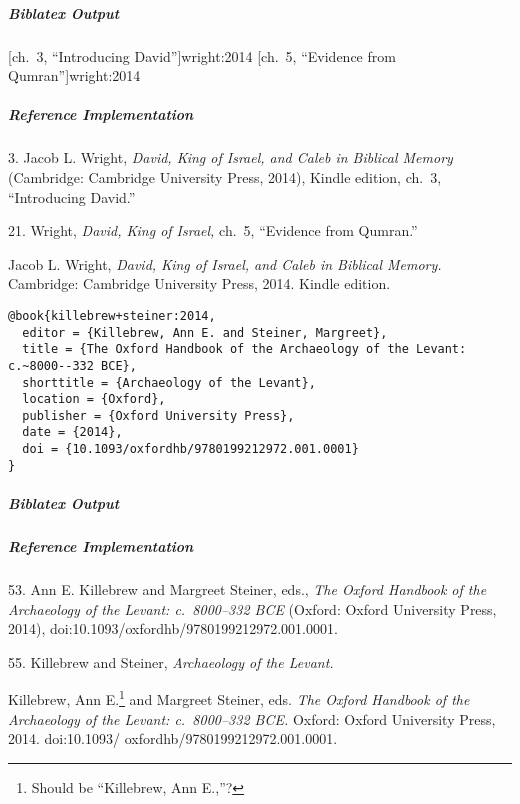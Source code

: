 \documentclass[a4paper]{article}
\newenvironment{biboutput}{%
  \subparagraph{Biblatex Output}
}{\color{black}}
\newenvironment{refimp}{%
  \subparagraph{Reference Implementation}
  \color{reference-colour}
  \rm
}{\par\color{black}}
\begin{document}
\begin{biboutput}
  [ch.~3, \mkbibquote{Introducing David}]{wright:2014}
  [ch.~5, \mkbibquote{Evidence from Qumran}]{wright:2014}
\end{biboutput}

\begin{refimp}
  \hspace*{\bibindent}3. Jacob L. Wright, \emph{David, King of Israel, and
  Caleb in Biblical Memory} (Cambridge: Cambridge University Press, 2014),
  Kindle edition, ch.~3, “Introducing David.”

  \hspace*{\bibindent}21. Wright, \emph{David, King of Israel,} ch.~5,
  “Evidence from Qumran.”

  \hangindent\bibindent Jacob L. Wright, \emph{David, King of Israel, and
  Caleb in Biblical Memory.} Cambridge: Cambridge University Press, 2014.
  Kindle edition.
\end{refimp}

\begin{lstlisting}
@book{killebrew+steiner:2014,
  editor = {Killebrew, Ann E. and Steiner, Margreet},
  title = {The Oxford Handbook of the Archaeology of the Levant: c.~8000--332 BCE},
  shorttitle = {Archaeology of the Levant},
  location = {Oxford},
  publisher = {Oxford University Press},
  date = {2014},
  doi = {10.1093/oxfordhb/9780199212972.001.0001}
}
\end{lstlisting}

\begin{biboutput}
\end{biboutput}

\begin{refimp}
  \hspace*{\bibindent}53. Ann E. Killebrew and Margreet Steiner, eds.,
  \emph{The Oxford Handbook of the Archaeology of the Levant: c.~8000–332 BCE}
  (Oxford: Oxford University Press, 2014),
  doi:10.1093/oxfordhb/9780199212972.001.0001.

  \hspace*{\bibindent}55. Killebrew and Steiner, \emph{Archaeology of the
  Levant.}

  \hangindent\bibindent Killebrew, Ann E.\footnote{Should be “Killebrew, Ann
  E.,”?} and Margreet Steiner, eds. \emph{The Oxford Handbook of the
  Archaeology of the Levant: c.~8000–332 BCE.} Oxford: Oxford University
  Press, 2014. doi:10.1093/ oxfordhb/9780199212972.001.0001.
\end{refimp}
\end{document}

